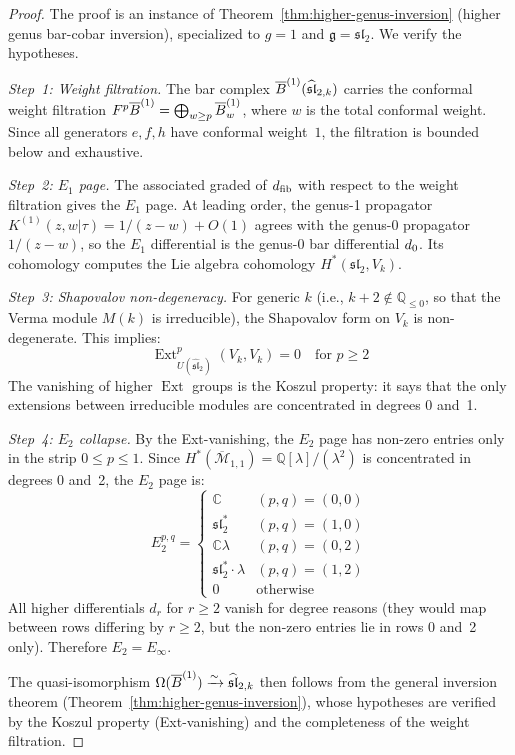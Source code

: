 \begin{proof}
The proof is an instance of Theorem~\ref{thm:higher-genus-inversion} (higher genus bar-cobar inversion), specialized to $g=1$ and $\mathfrak{g} = \mathfrak{sl}_2$.  We verify the hypotheses.

\emph{Step~1: Weight filtration.}
The bar complex $\overline{B}^{(1)}(\widehat{\mathfrak{sl}}_{2,k})$ carries the conformal weight filtration $F^p\overline{B}^{(1)} = \bigoplus_{w \geq p} \overline{B}^{(1)}_w$, where $w$ is the total conformal weight.  Since all generators $e, f, h$ have conformal weight~$1$, the filtration is bounded below and exhaustive.

\emph{Step~2: $E_1$ page.}
The associated graded of $d_{\mathrm{fib}}$ with respect to the weight filtration gives the $E_1$ page.  At leading order, the genus-1 propagator $K^{(1)}(z,w|\tau) = 1/(z-w) + O(1)$ agrees with the genus-0 propagator $1/(z-w)$, so the $E_1$ differential is the genus-0 bar differential $d_0$.  Its cohomology computes the Lie algebra cohomology $H^*(\mathfrak{sl}_2, V_k)$.

\emph{Step~3: Shapovalov non-degeneracy.}
For generic $k$ (i.e., $k+2 \notin \mathbb{Q}_{\leq 0}$, so that the Verma module $M(k)$ is irreducible), the Shapovalov form on $V_k$ is non-degenerate.  This implies:
\begin{equation}
\operatorname{Ext}^p_{U(\widehat{\mathfrak{sl}}_2)}(V_k, V_k) = 0 \quad \text{for } p \geq 2
\end{equation}
The vanishing of higher $\operatorname{Ext}$ groups is the Koszul property: it says that the only extensions between irreducible modules are concentrated in degrees 0 and~1.

\emph{Step~4: $E_2$ collapse.}
By the Ext-vanishing, the $E_2$ page has non-zero entries only in the strip $0 \leq p \leq 1$.  Since $H^*(\overline{\mathcal{M}}_{1,1}) = \mathbb{Q}[\lambda]/(\lambda^2)$ is concentrated in degrees 0 and~2, the $E_2$ page is:
\begin{equation}
E_2^{p,q} = \begin{cases}
\mathbb{C} & (p,q) = (0,0) \\
\mathfrak{sl}_2^* & (p,q) = (1,0) \\
\mathbb{C}\lambda & (p,q) = (0,2) \\
\mathfrak{sl}_2^* \cdot \lambda & (p,q) = (1,2) \\
0 & \text{otherwise}
\end{cases}
\end{equation}
All higher differentials $d_r$ for $r \geq 2$ vanish for degree reasons (they would map between rows differing by $r \geq 2$, but the non-zero entries lie in rows 0 and~2 only).  Therefore $E_2 = E_\infty$.

The quasi-isomorphism $\Omega(\overline{B}^{(1)}) \xrightarrow{\sim} \widehat{\mathfrak{sl}}_{2,k}$ then follows from the general inversion theorem (Theorem~\ref{thm:higher-genus-inversion}), whose hypotheses are verified by the Koszul property (Ext-vanishing) and the completeness of the weight filtration.
\end{proof}

